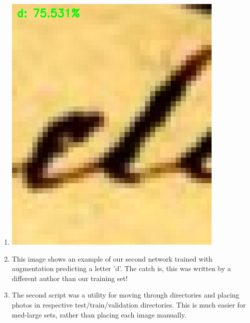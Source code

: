\documentclass[12pt]{article} %
\begin{document}
\begin{enumerate}[label = (\roman*)]
\item \includegraphics{This_is_d1}
\item This image shows an example of our second network trained with augmentation predicting a letter 'd'. The catch is, this was written by a different author than our training set!
\item The second script was a utility for moving through directories and placing photos in respective test/train/validation directories. This is much easier for med-large sets, rather than placing each image manually.
\end{enumerate}
\end{document}
